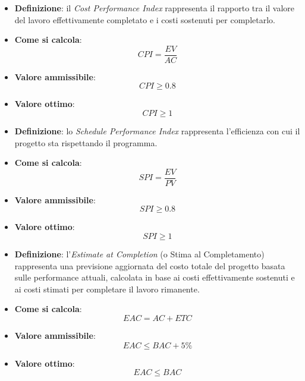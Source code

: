\hypertarget{6M}{}
\begin{itemize}
	\item \textbf{Definizione}: il \textit{Cost Performance Index} rappresenta il rapporto tra il valore del lavoro effettivamente completato e i costi sostenuti per completarlo.
	\item \textbf{Come si calcola}: \begin{equation*}CPI = \frac{EV}{AC}\end{equation*}
	\item \textbf{Valore ammissibile}: \begin{equation*}CPI \geq 0.8\end{equation*}
	\item \textbf{Valore ottimo}: \begin{equation*}CPI \geq 1\end{equation*}
\end{itemize}

\hypertarget{7M}{}
\begin{itemize}
	\item \textbf{Definizione}: lo \textit{Schedule Performance Index} rappresenta l'efficienza con cui il progetto sta rispettando il programma.
	\item \textbf{Come si calcola}: \begin{equation*}SPI = \frac{EV}{PV}\end{equation*}
	\item \textbf{Valore ammissibile}: \begin{equation*}SPI \geq 0.8\end{equation*}
	\item \textbf{Valore ottimo}: \begin{equation*}SPI \geq 1\end{equation*}
\end{itemize}

\hypertarget{8M}{}
\begin{itemize}
	\item \textbf{Definizione}: l'\textit{Estimate at Completion} (o Stima al Completamento) rappresenta una previsione aggiornata del costo totale del progetto basata sulle performance attuali, calcolata in base ai costi effettivamente sostenuti e ai costi stimati per completare il lavoro rimanente.
	\item \textbf{Come si calcola}: \begin{equation*}EAC = AC + ETC\end{equation*}
	\item \textbf{Valore ammissibile}: \begin{equation*}EAC \leq BAC + 5\%\end{equation*}
	\item \textbf{Valore ottimo}: \begin{equation*}EAC \leq BAC\end{equation*}
\end{itemize}

